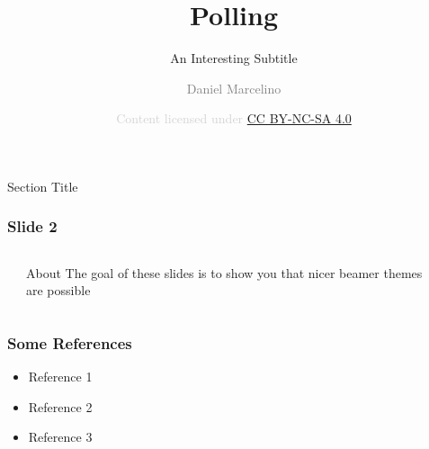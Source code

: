 \documentclass{beamer}
\title[Big Polling]{\LARGE Polling}
\subtitle[Subtitle]{\large An Interesting Subtitle}
\author[danielmarcelino.com]{
 \textcolor{gray}{Daniel Marcelino}
}
\institute[]{\scriptsize \textcolor{lightgray}{Month year}}
\date[CC BY-SA-NC 4.0]{
 \textcolor{lightgray}{\tiny{Content licensed under
 \href{http://creativecommons.org/licenses/by-nc-sa/4.0/}{CC BY-NC-SA 4.0}}}
}
\begin{document}



\begin{Schunk}
\end{Schunk}



\begin{frame}[plain]
 \titlepage
\end{frame}


\begin{frame}
 \begin{center}
  \Huge{\textcolor{mandarina}{Section Title}}
 \end{center}
\end{frame}


\begin{frame}
\frametitle{Slide 2}

\begin{columns}[t]
\begin{column}{0.1\textwidth}
\end{column}
\begin{column}{0.8\textwidth}

\begin{block}{About}
The goal of these slides is to show you that nicer beamer themes are possible
\end{block}

\end{column}
\begin{column}{0.1\textwidth}
\end{column}
\end{columns}

\end{frame}


\begin{frame}
\frametitle{Some References}

\begin{itemize}
 \item Reference 1 \\
 \item Reference 2 \\
 \item Reference 3 \\
\end{itemize}

\end{frame}
\end{document}
